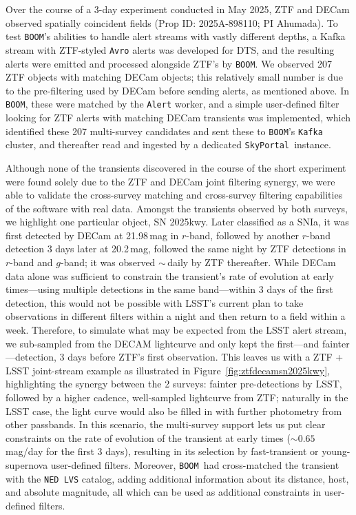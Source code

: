 \documentclass[twocolumn]{aastex631}
\newcommand{\boom}{\texttt{BOOM }}
\newcommand{\kafka}{\texttt{Kafka }}
\newcommand{\skyportal}{\texttt{SkyPortal }}
\begin{document}
Over the course of a 3-day experiment conducted in May 2025, ZTF and DECam observed spatially coincident fields (Prop ID: 2025A-898110; PI Ahumada). To test \texttt{BOOM}'s abilities to handle alert streams with vastly different depths, a Kafka stream with ZTF-styled \texttt{Avro} alerts was developed for DTS, and the resulting alerts were emitted and processed alongside ZTF's by \texttt{BOOM}. We observed 207 ZTF objects with matching DECam objects; this relatively small number is due to the pre-filtering used by DECam before sending alerts, as mentioned above. In \texttt{BOOM}, these were matched by the \texttt{Alert} worker, and a simple user-defined filter looking for ZTF alerts with matching DECam transients was implemented, which identified these 207 multi-survey candidates and sent these to \texttt{BOOM}'s \kafka cluster, and thereafter read and ingested by a dedicated \skyportal instance.

Although none of the transients discovered in the course of the short experiment were found solely due to the ZTF and DECam joint filtering synergy, we were able to validate the cross-survey matching and cross-survey filtering capabilities of the software with real data. Amongst the transients observed by both surveys, we highlight one particular object, SN 2025kwy. Later classified as a SNIa, it was first detected by DECam at 21.98\,mag in $r$-band, followed by another $r$-band detection 3 days later at 20.2\,mag, followed the same night by ZTF detections in $r$-band and $g$-band; it was observed $\sim$\,daily by ZTF thereafter. While DECam data alone was sufficient to constrain the transient's rate of evolution at early times---using multiple detections in the same band---within 3 days of the first detection, this would not be possible with LSST's current plan to take observations in different filters within a night and then return to a field within a week. Therefore, to simulate what may be expected from the LSST alert stream, we sub-sampled from the DECAM lightcurve and only kept the first---and fainter---detection, 3 days before ZTF's first observation. This leaves us with a ZTF + LSST joint-stream example as illustrated in Figure~\ref{fig:ztfdecamsn2025kwy}, highlighting the synergy between the 2 surveys: fainter pre-detections by LSST, followed by a higher cadence, well-sampled lightcurve from ZTF; naturally in the LSST case, the light curve would also be filled in with further photometry from other passbands. In this scenario, the multi-survey support lets us put clear constraints on the rate of evolution of the transient at early times ($\sim 0.65$ mag/day for the first 3 days), resulting in its selection by fast-transient or young-supernova user-defined filters. Moreover, \boom had cross-matched the transient with the \texttt{NED LVS} catalog, adding additional information about its distance, host, and absolute magnitude, all which can be used as additional constraints in user-defined filters.
\end{document}
